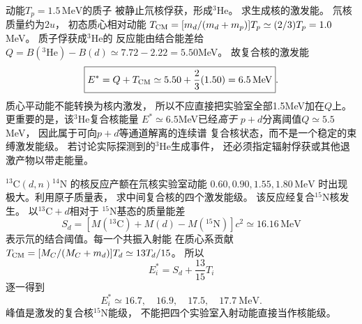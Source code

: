 动能$T_p=1.5\,\mathrm{MeV}$的质子
被静止氘核俘获，形成$^{3}\mathrm{He}$。
求生成核的激发能。
\exsolution
氘核质量约为$2u$，
初态质心相对动能
$T_{\rm CM}=[m_d/(m_d+m_p)]T_p
\simeq(2/3)T_p=1.0$MeV。
质子俘获成$^{3}\mathrm{He}$的
反应能由结合能差给
$Q=B(^{3}\mathrm{He})-B(d)
\simeq7.72-2.22=5.50$MeV。
故复合核的激发能
\[
 \boxed{E^*=Q+T_{\rm CM}
 \simeq5.50+\frac23(1.50)
 =6.5\,\mathrm{MeV}}.
\]
\excheck 质心平动能不能转换为核内激发，
所以不应直接把实验室全部1.5MeV加在$Q$上。
更重要的是，该$^{3}$He复合核能量
$E^*\simeq6.5$MeV已经\emph{高于}
$p+d$分离阈值$Q\simeq5.5$MeV，
因此属于可向$p+d$等通道解离的连续谱
复合核状态，而不是一个稳定的束缚激发能级。
若讨论实际探测到的$^{3}$He生成事件，
还必须指定辐射俘获或其他退激产物以带走能量。

$^{13}\mathrm C(d,n){}^{14}\mathrm N$
的核反应产额在氘核实验室动能
$0.60,0.90,1.55,1.80\,\mathrm{MeV}$
时出现极大。利用原子质量表，
求中间复合核的四个激发能级。
\exsolution
该反应经复合$^{15}\mathrm N$核发生。
以$^{13}\mathrm C+d$相对于
$^{15}\mathrm N$基态的质量能差
\[
 S_d=[M(^{13}\mathrm C)+M(d)-M(^{15}\mathrm N)]c^2
 \simeq16.16\,\mathrm{MeV}
\]
表示氘的结合阈值。每一个共振入射能
在质心系贡献
$T_{\rm CM}=[M_C/(M_C+m_d)]T_d
\simeq13T_d/15$。
所以
\[
 \boxed{E_i^*=S_d+\frac{13}{15}T_i}
\]
逐一得到
\[
 \boxed{E_i^*\simeq
 16.7,\quad16.9,\quad17.5,\quad17.7\ \mathrm{MeV}}.
\]
\excheck 峰值是激发的复合核$^{15}$N能级，
不能把四个实验室入射动能直接当作核能级。
